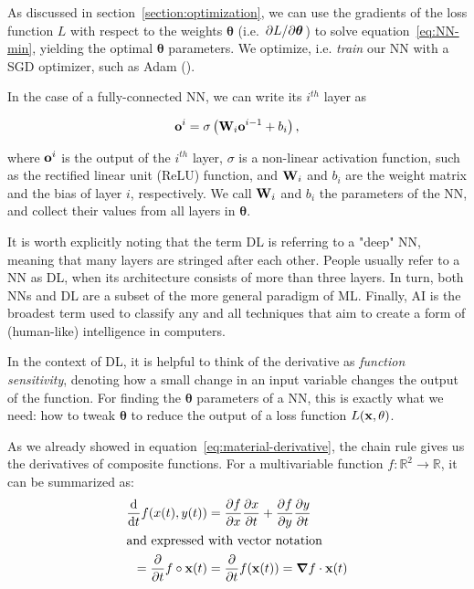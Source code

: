 As discussed in section~\ref{section:optimization}, we can use the
gradients of the loss function $L$ with respect to the weights
$\boldsymbol{\theta}$ (i.e. $\pdv*{L}{\boldsymbol\theta}$) to solve
equation~\eqref{eq:NN-min}, yielding the optimal $\boldsymbol{\theta}$
parameters. We optimize, i.e. \textit{train} our \ac{NN} with a \acf{SGD}
optimizer, such as Adam (\cite{adam}).

In the case of a fully-connected \ac{NN}, we can write its $i^{th}$ layer as 

\begin{equation}\label{nn-single-layer-math}
    \vb{o}^i = \sigma\left(\vb{W}_i \vb{o}^{i-1} + b_i\right),
\end{equation}

where $\vb{o}^i$ is the output of the $i^{th}$ layer, $\sigma$ is a non-linear
activation function, such as the rectified linear unit (ReLU) function, and
$\vb{W}_i$ and $b_i$ are the weight matrix and the bias of layer $i$,
respectively. We call $\vb{W}_i$ and $b_i$ the parameters of the \ac{NN},
and collect their values from all layers in $\boldsymbol\theta$.

It is worth explicitly noting that the term \acf{DL} is referring to a "deep"
\acf{NN}, meaning that many layers are stringed after each other. People usually
refer to a \ac{NN} as \ac{DL}, when its architecture consists of more than three
layers. In turn, both \acp{NN} and \ac{DL} are a subset of the more general
paradigm of \acf{ML}. Finally, \acf{AI} is the broadest term used to classify
any and all techniques that aim to create a form of (human-like) intelligence in
computers.

In the context of \ac{DL}, it is helpful to think of the derivative as
\textit{function sensitivity}, denoting how a small change in an input variable
changes the output of the function.  For finding the $\boldsymbol\theta$
parameters of a \ac{NN}, this is exactly what we need: how to tweak
$\boldsymbol{\theta}$ to reduce the output of a loss function
$L(\vb{x},\vb{\theta})$.

As we already showed in equation~\eqref{eq:material-derivative}, the chain rule
gives us the derivatives of composite functions. For a multivariable function
$f: \mathbb{R}^2 \to \mathbb{R}$, it can be summarized as:
\begin{align}
    \dv{}{t}f(x(t), y(t)) &=  \pdv{f}{x}\pdv{x}{t} + \pdv{f}{y}\pdv{y}{t}\\
    \intertext{and expressed with vector notation}
    =\pdv{}{t}f \circ \vb{x}(t) &= \pdv{}{t}f(\vb{x}(t)) = \grad{f} \cdot \vb{x}(t)
\end{align}

